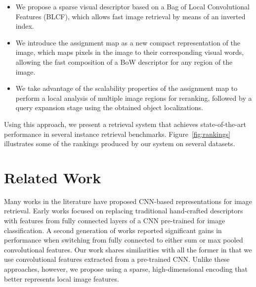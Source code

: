 \documentclass{sig-arxiv}
\begin{document}
\begin{itemize}
\setlength{\itemsep}{0pt}
\item We propose a sparse visual descriptor based on a Bag of Local Convolutional Features (BLCF), which allows fast image retrieval by means of an inverted index. 

\item We introduce the assignment map as a new compact representation of the image, which maps pixels in the image to their corresponding visual words, allowing the fast composition of a BoW descriptor for any region of the image. 

\item We take advantage of the scalability properties of the assignment map to perform a local analysis of multiple image regions for reranking, followed by a query expansion stage using the obtained object localizations. 

\end{itemize}%
Using this approach, we present a retrieval system that achieves state-of-the-art performance in several instance retrieval benchmarks.
Figure~\ref{fig:rankings} illustrates some of the rankings produced by our system on several datasets.

\section{Related Work}\label{2_soa}

Many works in the literature have proposed CNN-based representations for image retrieval. Early works \cite{neuralcodes,cnnofftheshelf} focused on replacing traditional hand-crafted descriptors with features from fully connected layers of a CNN pre-trained for image classification. A second generation of works reported significant gains in performance when switching from fully connected to either sum \cite{babenko2015,kalantidis2015} or max \cite{razavian2015,tolias2015} pooled convolutional features. Our work shares similarities with all the former in that we use convolutional features extracted from a pre-trained CNN. Unlike these approaches, however, we propose using a sparse, high-dimensional encoding that better represents local image features.
\end{document}

